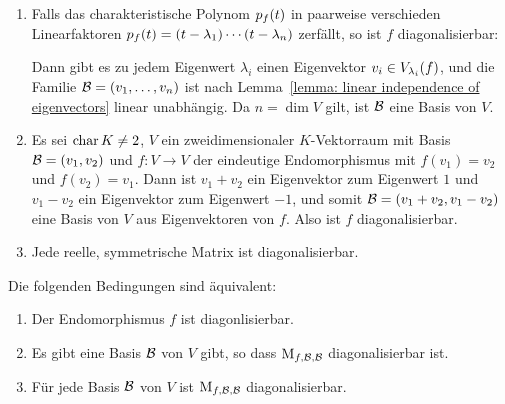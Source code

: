 \begin{example}
  \leavevmode
  \begin{enumerate}
    \item
      Falls das charakteristische Polynom $\charpol{f}(t)$ in paarweise verschieden Linearfaktoren $\charpol{f}(t) = (t - \lambda_1) \dotsm (t - \lambda_n)$ zerfällt, so ist $f$ diagonalisierbar:
      
      Dann gibt es zu jedem Eigenwert $\lambda_i$ einen Eigenvektor $v_i \in \eigenspace{V}{f}{\lambda_i}$, und die Familie $\basis{B} = (v_1, \dotsc, v_n)$ ist nach Lemma~\ref{lemma: linear independence of eigenvectors} linear unabhängig.
      Da $n = \dim V$ gilt, ist $\basis{B}$ eine Basis von $V$.
      
    \item
      Es sei $\ringchar{K} \neq 2$, $V$ ein zweidimensionaler $K$-Vektorraum mit Basis $\basis{B} = (v_1, v_2)$ und $f \colon V \to V$ der eindeutige Endomorphismus mit $f(v_1) = v_2$ und $f(v_2) = v_1$.
      Dann ist $v_1 + v_2$ ein Eigenvektor zum Eigenwert $1$ und $v_1 - v_2$ ein Eigenvektor zum Eigenwert $-1$, und somit $\basis{B} = (v_1 + v_2, v_1 - v_2)$  eine Basis von $V$ aus Eigenvektoren von $f$.
      Also ist $f$ diagonalisierbar.
      
    \item
      Jede reelle, symmetrische Matrix ist diagonalisierbar.
  \end{enumerate}
\end{example}

\begin{lemma}
  Die folgenden Bedingungen sind äquivalent:
  \begin{enumerate}
    \item
      Der Endomorphismus $f$ ist diagonlisierbar.
    \item
      Es gibt eine Basis $\basis{B}$ von $V$ gibt, so dass $\repmatrixendo{f}{\basis{B}}$ diagonalisierbar ist.
    \item
      Für jede Basis $\basis{B}$ von $V$ ist $\repmatrixendo{f}{\basis{B}}$ diagonalisierbar.
  \end{enumerate}
\end{lemma}

